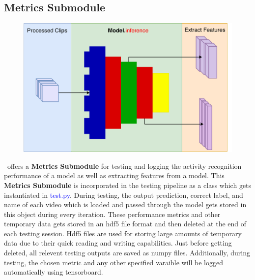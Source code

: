 \documentclass{llncs}
\begin{document}
\subsection{Metrics Submodule}
\label{sec:metrics}

\begin{figure}[t!]
\centering
\includegraphics[width=0.7\columnwidth]{images/extract_features_h.pdf}
\caption{}
\label{fig:extract_features}
\end{figure}

\acro~offers a \textbf{Metrics Submodule} for testing and logging the activity recognition performance of a model as well as extracting features from a model. 
This \textbf{Metrics Submodule} is incorporated in the testing pipeline as a class which gets instantiated in \textcolor{blue}{test.py}.
During testing, the output prediction, correct label, and name of each video which is loaded and passed through the model gets stored in this object during every iteration.
These performance metrics and other temporary data gets stored in an hdf5 file format and then deleted at the end of each testing session.
Hdf5 files are used for storing large amounts of temporary data due to their quick reading and writing capabilities.
Just before getting deleted, all relevent testing outputs are saved as numpy files.
Additionally, during testing, the chosen metric and any other specified varaible will be logged automatically using tensorboard.
\end{document}
